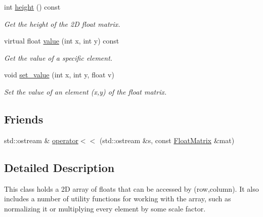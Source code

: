 \begin{DoxyCompactItemize}
\mbox{\label{classimage__tools_1_1FloatMatrix_aebac6742a9a1e536f781b54fd8f1182b}} 
int \hyperlink{classimage__tools_1_1FloatMatrix_aebac6742a9a1e536f781b54fd8f1182b}{height} () const
\begin{DoxyCompactList}\small\item\em Get the height of the 2D float matrix. \end{DoxyCompactList}\item 
\mbox{\label{classimage__tools_1_1FloatMatrix_ab22e1ac2436eec5a5ac6a9c21b0e2a2d}} 
virtual float \hyperlink{classimage__tools_1_1FloatMatrix_ab22e1ac2436eec5a5ac6a9c21b0e2a2d}{value} (int x, int y) const
\begin{DoxyCompactList}\small\item\em Get the value of a specific element. \end{DoxyCompactList}\item 
\mbox{\label{classimage__tools_1_1FloatMatrix_a947b60843883d934b48848c438cfa1fe}} 
void \hyperlink{classimage__tools_1_1FloatMatrix_a947b60843883d934b48848c438cfa1fe}{set\+\_\+value} (int x, int y, float v)
\begin{DoxyCompactList}\small\item\em Set the value of an element (x,y) of the float matrix. \end{DoxyCompactList}\end{DoxyCompactItemize}
\subsection*{Friends}
\begin{DoxyCompactItemize}
\item 
std\+::ostream \& \hyperlink{classimage__tools_1_1FloatMatrix_aa20d6a194db78bcaf737647f7c89baee}{operator$<$$<$} (std\+::ostream \&s, const \hyperlink{classimage__tools_1_1FloatMatrix}{Float\+Matrix} \&mat)
\end{DoxyCompactItemize}


\subsection{Detailed Description}
This class holds a 2D array of floats that can be accessed by (row,column). It also includes a number of utility functions for working with the array, such as normalizing it or multiplying every element by some scale factor. 

